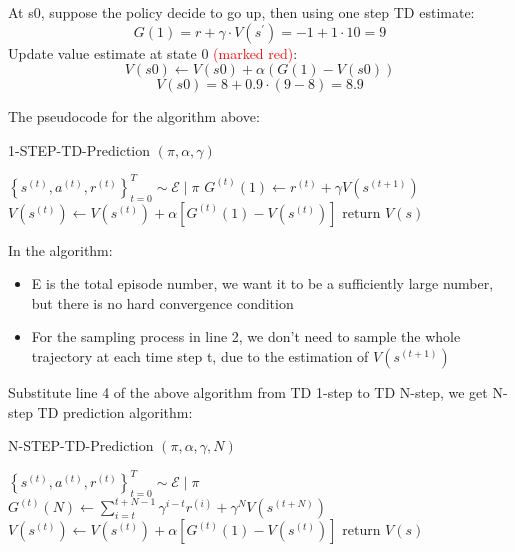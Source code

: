 \documentclass[11pt]{article}
\begin{document}
At s0, suppose the policy decide to go up, then using one step TD estimate:
\[ G(1) = r + \gamma \cdot V(s^\prime) = -1 + 1 \cdot 10 = 9 \]
Update value estimate at state 0 \textcolor{red}{(marked red)}:
\[ V(s0) \leftarrow V(s0) + \alpha (G(1) - V(s0)) \]
\[ V(s0) = 8 + 0.9 \cdot (9-8) = 8.9 \]

The pseudocode for the algorithm above:
\begin{algorithm}[H]
\caption{1-STEP-TD-Prediction $(\pi,\alpha,\gamma)$}
\label{algo:1std}
\begin{algorithmic}[1]
    \State $\left\{s^{(t)}, a^{(t)}, r^{(t)}\right\}_{t=0}^{T} \sim \mathcal{E} \mid \pi$
        \State $G^{(t)}\left(1\right) \leftarrow r^{(t)} + \gamma V(s^{(t+1)})$
        \State $V(s^{(t)}) \leftarrow V(s^{(t)}) + \alpha \left[ G^{(t)}(1) - V(s^{(t)}) \right]$
    \EndFor
\EndFor
\State $\text{return } V(s) $
\end{algorithmic}
\end{algorithm}
In the algorithm:
\begin{itemize}
    \item E is the total episode number, we want it to be a sufficiently large number, but there is no hard convergence condition
    \item For the sampling process in line 2, we don't need to sample the whole trajectory at each time step t, due to the estimation of $V(s^{(t+1)})$
\end{itemize}

Substitute line 4 of the above algorithm from TD 1-step to TD N-step, we get N-step TD prediction algorithm:
\begin{algorithm}[H]
\caption{N-STEP-TD-Prediction $(\pi,\alpha,\gamma,N)$}
\label{algo:1std}
\begin{algorithmic}[1]
    \State $\left\{s^{(t)}, a^{(t)}, r^{(t)}\right\}_{t=0}^{T} \sim \mathcal{E} \mid \pi$
        \State $G^{(t)}\left(N\right) \leftarrow \sum_{i=t}^{t+N-1} \gamma^{i-t} r^{(i)} + \gamma^N V(s^{(t+N)})$
        \State $V(s^{(t)}) \leftarrow V(s^{(t)}) + \alpha \left[ G^{(t)}(1) - V(s^{(t)}) \right]$
    \EndFor
\EndFor
\State $\text{return } V(s) $
\end{algorithmic}
\end{algorithm}
\end{document}
